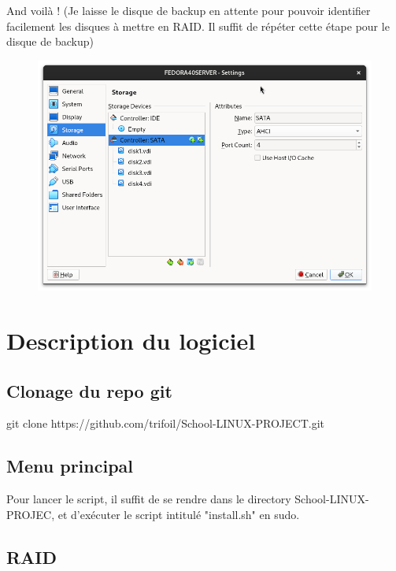 \documentclass{article}
\begin{document}
And voilà ! (Je laisse le disque de backup en attente pour pouvoir identifier facilement les disques à mettre en RAID. Il suffit de répéter cette étape pour le disque de backup)

\begin{figure}[h!]
		\centering
		\includegraphics[width=1\textwidth]{vbox22.png}
\end{figure}


\pagebreak


\pagebreak

\section{Description du logiciel}

\subsection{Clonage du repo git}

git clone https://github.com/trifoil/School-LINUX-PROJECT.git


\subsection{Menu principal}

Pour lancer le script, il suffit de se rendre dans le directory School-LINUX-PROJEC, et d'exécuter le script intitulé "install.sh" en sudo.

\subsection{RAID}
\end{document}
